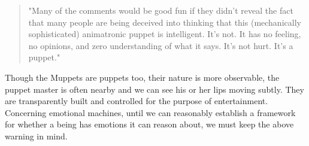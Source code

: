 \begin{quote}
"Many of the comments would be good fun if they didn’t reveal the fact that many people are being deceived into thinking that this (mechanically sophisticated) animatronic puppet is intelligent. It’s not. It has no feeling, no opinions, and zero understanding of what it says. It’s not hurt. It’s a puppet." \cite{sofia}
\end{quote}

Though the Muppets are puppets too, their nature is more observable, the puppet master is often nearby and we can see his or her lips moving subtly. They are transparently built and controlled for the purpose of entertainment. Concerning emotional machines, until we can reasonably establish a framework for whether a being has emotions it can reason about, we must keep the above warning in mind.